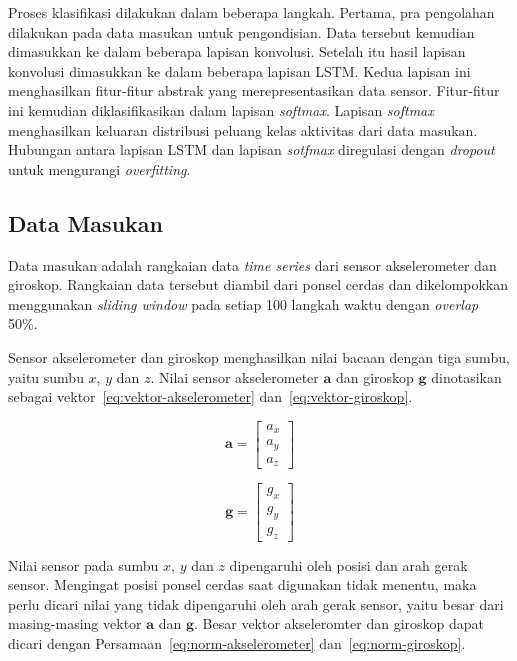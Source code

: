 Proses klasifikasi dilakukan dalam beberapa langkah. Pertama, pra pengolahan dilakukan pada data masukan untuk pengondisian. Data tersebut kemudian dimasukkan ke dalam beberapa lapisan konvolusi. Setelah itu hasil lapisan konvolusi dimasukkan ke dalam beberapa lapisan LSTM\@. Kedua lapisan ini menghasilkan fitur-fitur abstrak yang merepresentasikan data sensor. Fitur-fitur ini kemudian diklasifikasikan dalam lapisan \textit{softmax}. Lapisan \textit{softmax} menghasilkan keluaran distribusi peluang kelas aktivitas dari data masukan. Hubungan antara lapisan LSTM dan lapisan \textit{sotfmax} diregulasi dengan \textit{dropout} untuk mengurangi \textit{overfitting}.

\subsection{Data Masukan}
Data masukan adalah rangkaian data \textit{time series} dari sensor akselerometer dan giroskop. Rangkaian data tersebut diambil dari ponsel cerdas dan dikelompokkan menggunakan \textit{sliding window} pada setiap 100 langkah waktu dengan \textit{overlap} 50\%.

Sensor akselerometer dan giroskop menghasilkan nilai bacaan dengan tiga sumbu, yaitu sumbu $x$, $y$ dan $z$. Nilai sensor akselerometer $\pmb{a}$ dan giroskop $\pmb{g}$ dinotasikan sebagai vektor~\ref{eq:vektor-akselerometer} dan~\ref{eq:vektor-giroskop}.

\begin{equation}
    \label{eq:vektor-akselerometer}
    \pmb{a} = 
    \begin{bmatrix}
        a_x \\
        a_y \\
        a_z
    \end{bmatrix}
\end{equation}

\begin{equation}
    \label{eq:vektor-giroskop}
    \pmb{g} = 
    \begin{bmatrix}
        g_x \\
        g_y \\
        g_z
    \end{bmatrix}
\end{equation}

Nilai sensor pada sumbu $x$, $y$ dan $z$ dipengaruhi oleh posisi dan arah gerak sensor. Mengingat posisi ponsel cerdas saat digunakan tidak menentu, maka perlu dicari nilai yang tidak dipengaruhi oleh arah gerak sensor, yaitu besar dari masing-masing vektor $\pmb{a}$ dan $\pmb{g}$. Besar vektor akseleromter dan giroskop dapat dicari dengan Persamaan~\ref{eq:norm-akselerometer} dan~\ref{eq:norm-giroskop}.

